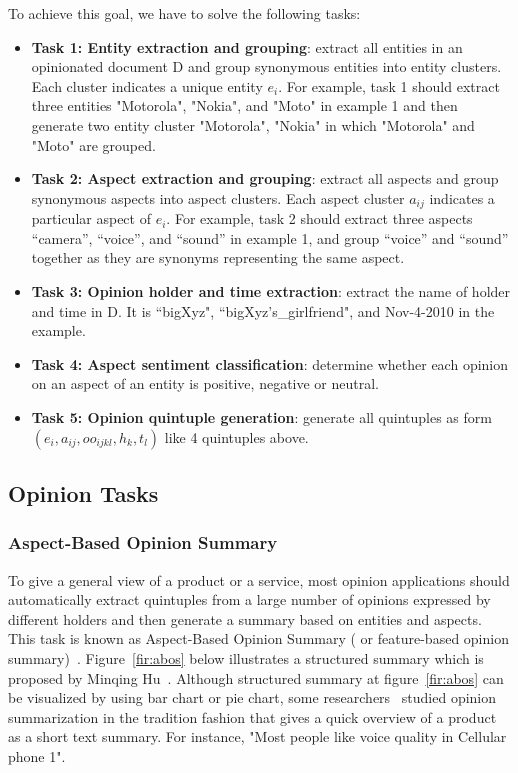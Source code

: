 \documentclass{article}
\begin{document}
To achieve this goal, we have to solve the following tasks:
\begin{itemize}
    \item \textbf{Task 1: Entity extraction and grouping}: extract all entities in an opinionated document D and group synonymous entities into entity clusters. Each cluster indicates a unique entity $e_i$. For example, task 1 should extract three entities "Motorola", "Nokia", and "Moto" in example 1 and then generate two entity cluster "Motorola", "Nokia" in which "Motorola" and "Moto" are grouped.
    \item \textbf{Task 2: Aspect extraction and grouping}: extract all aspects and group synonymous aspects into aspect clusters. Each aspect cluster $a_{ij}$ indicates a particular aspect of $e_i$. For example, task 2 should extract three aspects “camera”, “voice”, and “sound” in example 1, and group “voice” and “sound” together as they are synonyms representing the same aspect.
    \item \textbf{Task 3: Opinion holder and time extraction}: extract the name of holder and time in D. It is “bigXyz", “bigXyz's\_girlfriend", and Nov-4-2010 in the example.
    \item \textbf{Task 4: Aspect sentiment classification}: determine whether each opinion on an aspect of an entity is positive, negative or neutral. 
    \item \textbf{Task 5: Opinion quintuple generation}: generate all quintuples as form $(e_i, a_{ij}, oo_{ijkl}, h_k, t_l)$ like 4 quintuples above.
\end{itemize}


\subsection{Opinion Tasks}
\subsubsection{Aspect-Based Opinion Summary}

To give a general view of a product or a service, most opinion applications should automatically extract quintuples from a large number of opinions expressed by different holders and then generate a summary based on entities and aspects.
This task is known as Aspect-Based Opinion Summary ( or feature-based opinion summary)~\cite{Hu:2004:MSC:1014052.1014073, Liu:2005:OOA:1060745.1060797}.
Figure~\ref{fir:abos} below illustrates a structured summary which is proposed by     Minqing Hu~\cite{Hu:2004:MSC:1014052.1014073}. 
Although structured summary at figure~\ref{fir:abos} can be visualized by using bar chart or pie chart, some researchers~\cite{Beineke04anexploration,COIN:COIN417,Ku2016,Seki06opinion-focusedsummarization,Stoyanov:2006:PSC:1610075.1610123} studied opinion summarization in the tradition fashion that gives a quick overview of a product as a short text summary. 
For instance, "Most people like voice quality in Cellular phone 1".
\end{document}
